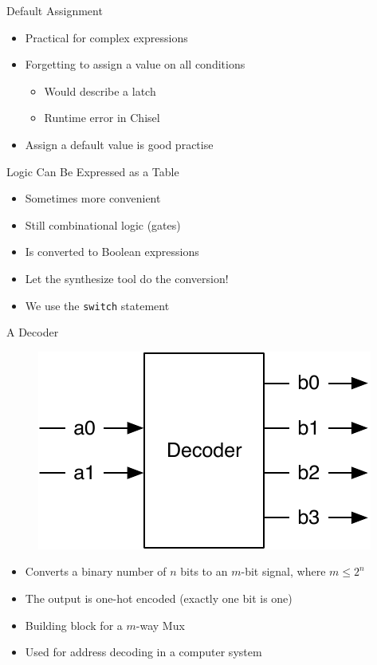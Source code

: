 \documentclass[xcolor=pdflatex,dvipsnames,table]{beamer}
\newcommand{\scale}{0.7}
\newcommand{\code}[1]{{\texttt{#1}}}
\begin{document}
\begin{frame}[fragile]{Default Assignment}
\begin{itemize}
\item Practical for complex expressions
\item Forgetting to assign a value on all conditions
\begin{itemize}
\item Would describe a latch
\item Runtime error in Chisel
\end{itemize}
\item Assign a default value is good practise
\end{itemize}
\end{frame}

\begin{frame}[fragile]{Logic Can Be Expressed as a Table}
\begin{itemize}
\item Sometimes more convenient 
\item Still combinational logic (gates)
\item Is converted to Boolean expressions
\item Let the synthesize tool do the conversion!
\item We use the \code{switch} statement
\end{itemize}
\end{frame}


\begin{frame}[fragile]{A Decoder}
\begin{figure}
  \includegraphics[scale=\scale]{../figures/decoder}
\end{figure}
\begin{itemize}
\item Converts a binary number of $n$ bits to an $m$-bit signal, where $m \leq 2^n$
\item The output is one-hot encoded (exactly one bit is one)
\item Building block for a $m$-way Mux
\item Used for address decoding in a computer system
\end{itemize}
\end{frame}
\end{document}
